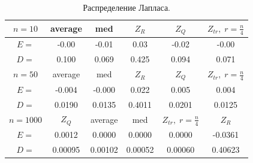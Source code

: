 \documentclass[a4]{article}
\begin{document}
			\begin{table}[h]
				\caption{ Распределение Лапласа.}
				\begin{center}
					\begin{tabular}{|c|c|c|c|c|c|}
						\hline
						$n = 10$    & average & med & $Z_R$ & $Z_Q$ & $Z_{tr},\;r=\frac{n}{4}$\\ \hline 
						$E = $    &  	-0.00    &    -0.01 &       0.03      &   -0.02      &  -0.00   \\ \hline
						$D = $     & 0.100      &   0.069        & 0.425      &   0.094       &  0.071    \\ \hline
						
						$n = 50$  & average & med & $Z_R$ & $Z_Q$ & $Z_{tr},\;r=\frac{n}{4}$\\ \hline
						$E = $     & -0.004       & -0.000       & 0.022 &         0.005 &         0.004   \\ \hline
						$D =$      & 	0.0190    &     0.0135  &       0.4011      &   0.0201      &   0.0125  \\ \hline
						
						$n = 1000$  & $Z_Q$ & average & med  & $Z_{tr},\;r=\frac{n}{4}$  & $Z_R$\\ \hline
						$E =$   &   0.0012   & 	0.0000    &     0.0000            &    0.0000  &       -0.0361   \\ \hline
						$D = $   &   0.00095  & 0.00102        & 0.00052                  &  0.00060  &  0.40623 \\ 
						\hline
					\end{tabular}
				\end{center}
			\end{table}
			\newpage
\end{document}
